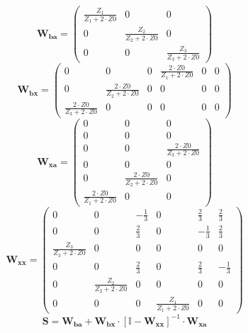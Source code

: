 \[ \mathbf{W_{ba}} = \left(\begin{array}{ccc} \frac{Z_1}{Z_1+2\cdot Z0} & 0 & 0 \\ 0 & \frac{Z_2}{Z_2+2\cdot Z0} & 0 \\ 0 & 0 & \frac{Z_3}{Z_3+2\cdot Z0} \end{array}\right) \]
\[ \mathbf{W_{bx}} = \left(\begin{array}{cccccc} 0 & 0 & 0 & \frac{2\cdot Z0}{Z_1+2\cdot Z0} & 0 & 0 \\ 0 & \frac{2\cdot Z0}{Z_2+2\cdot Z0} & 0 & 0 & 0 & 0 \\ \frac{2\cdot Z0}{Z_3+2\cdot Z0} & 0 & 0 & 0 & 0 & 0 \end{array}\right) \]
\[ \mathbf{W_{xa}} = \left(\begin{array}{ccc} 0 & 0 & 0 \\ 0 & 0 & 0 \\ 0 & 0 & \frac{2\cdot Z0}{Z_3+2\cdot Z0} \\ 0 & 0 & 0 \\ 0 & \frac{2\cdot Z0}{Z_2+2\cdot Z0} & 0 \\ \frac{2\cdot Z0}{Z_1+2\cdot Z0} & 0 & 0 \end{array}\right) \]
\[ \mathbf{W_{xx}} = \left(\begin{array}{cccccc} 0 & 0 & -\frac{1}{3} & 0 & \frac{2}{3} & \frac{2}{3} \\ 0 & 0 & \frac{2}{3} & 0 & -\frac{1}{3} & \frac{2}{3} \\ \frac{Z_3}{Z_3+2\cdot Z0} & 0 & 0 & 0 & 0 & 0 \\ 0 & 0 & \frac{2}{3} & 0 & \frac{2}{3} & -\frac{1}{3} \\ 0 & \frac{Z_2}{Z_2+2\cdot Z0} & 0 & 0 & 0 & 0 \\ 0 & 0 & 0 & \frac{Z_1}{Z_1+2\cdot Z0} & 0 & 0 \end{array}\right) \]
\[ \mathbf{S}=\mathbf{W_{ba}}+\mathbf{W_{bx}}\cdot\left[ \mathbb{I}  -\mathbf{W_{xx}}\right]^{-1}\cdot\mathbf{W_{xa}} \]
